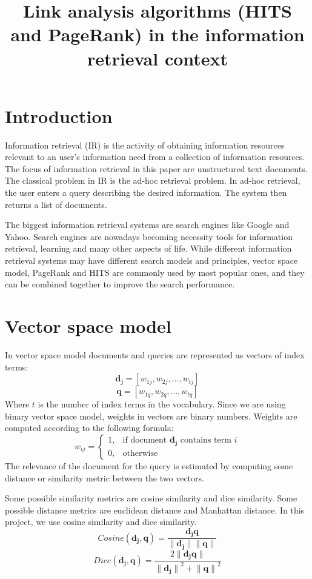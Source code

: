 \documentclass[10pt, a4paper]{article}
\title{Link analysis algorithms (HITS and PageRank) in the information retrieval context}
\begin{document}
\maketitleabstract

\section{Introduction}
Information retrieval (IR) is the activity of obtaining information resources relevant to an user’s information need from a collection of information resources. The focus of information retrieval in this paper are unstructured text documents. The classical problem in IR is the ad-hoc retrieval problem. In ad-hoc retrieval, the user enters a query describing the desired information. The system then returns a list of documents.

The biggest information retrieval systems are search engines like Google and Yahoo. Search engines are nowadays becoming necessity tools for information retrieval, learning and many other aspects of life. While different information retrieval systems may have different search models and principles, vector space model, PageRank and HITS are commonly used by most popular ones, and they can be combined together to improve the search performance.

\section{Vector space model}
In vector space model documents and queries are represented as vectors of index terms:
$$\mathbf{d_j} = [w_{1j}, w_{2j},..., w_{tj}]$$
$$\mathbf{q} = [w_{1q}, w_{2q},..., w_{tq}]$$
Where $t$ is the number of index terms in the vocabulary. Since we are using binary vector space model, weights in vectors are binary numbers. Weights are computed according to the following formula:
$$
w_{ij} = 
\begin{cases}
  1,& \text{if document } \mathbf{d_j} \text{ contains term } i\\
    0,              & \text{otherwise}
\end{cases}
$$
The relevance of the document for the query is estimated by computing some distance or similarity metric between the two vectors.

Some possible similarity metrics are cosine similarity and dice similarity. Some possible distance metrics are euclidean distance and Manhattan distance. In this project, we use cosine similarity and dice similarity.
$$Cosine(\mathbf{d_j}, \mathbf{q}) = \frac{\mathbf{d_j} \mathbf{q}}{\lVert \mathbf{d_j} \rVert \lVert \mathbf{q} \rVert}$$
$$Dice(\mathbf{d_j}, \mathbf{q}) = 
\frac{2\lVert \mathbf{d_j} \mathbf{q} \rVert}{{\lVert \mathbf{d_j} \rVert}^2 + {\lVert \mathbf{q} \rVert}^2}$$
\end{document}

